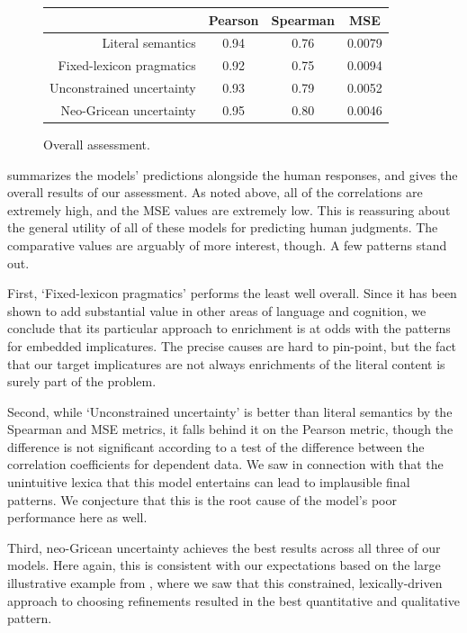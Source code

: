 \documentclass[leqno]{article}
\begin{document}
\begin{figure}[htp]
  \centering
  \begin{tabular}[c]{r c c c}
    \toprule
    & Pearson & Spearman & MSE \\
    \midrule
    Literal semantics         & 0.94 & 0.76 & 0.0079\\
    Fixed-lexicon pragmatics  & 0.92 & 0.75 & 0.0094\\
    Unconstrained uncertainty & 0.93 & 0.79 & 0.0052\\
    Neo-Gricean uncertainty   & 0.95 & 0.80 & 0.0046\\
    \bottomrule   
  \end{tabular}
  \caption{Overall assessment.}
  \label{fig:overall}
\end{figure}

 summarizes the models' predictions alongside
the human responses, and  gives the overall
results of our assessment. As noted above, all of the correlations are
extremely high, and the MSE values are extremely low. This is
reassuring about the general utility of all of these models for
predicting human judgments. The comparative values are arguably of
more interest, though. A few patterns stand out.

First, `Fixed-lexicon pragmatics' performs the least well overall.
Since it has been shown to add substantial value in other areas of
language and cognition, we conclude that its particular approach to
enrichment is at odds with the patterns for embedded implicatures.
The precise causes are hard to pin-point, but the fact that our target
implicatures are not always enrichments of the literal content is
surely part of the problem.

Second, while `Unconstrained uncertainty' is better than literal
semantics by the Spearman and MSE metrics, it falls behind it on the
Pearson metric, though the difference is not significant according to
a test of the difference between the correlation coefficients for
dependent data. We saw in connection with  that
the unintuitive lexica that this model entertains can lead to
implausible final patterns. We conjecture that this is the root cause
of the model's poor performance here as well.

Third, neo-Gricean uncertainty achieves the best results across
all three of our models. Here again, this is consistent with our
expectations based on the large illustrative example from
, where we saw that this constrained,
lexically-driven approach to choosing refinements resulted in the 
best quantitative and qualitative pattern.
\end{document}
